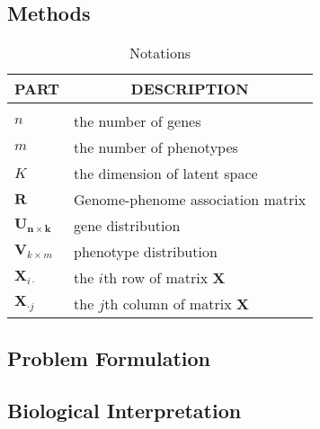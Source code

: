 \documentclass{bioinfo}
\begin{document}
\begin{methods}
\section{Methods}
\begin{table}[t]
\caption{Notations}
\label{sample-table}
\begin{center}
\begin{tabular}{ll}
\multicolumn{1}{c}{\bf PART}  &\multicolumn{1}{c}{\bf DESCRIPTION}
\\ \hline \\
$n$          &the number of genes \\
$m$          &the number of phenotypes \\
$K$          &the dimension of latent space \\
$\bm{R}$          &Genome-phenome association matrix \\
$\bm{U_{n\times k}}$         &gene distribution\\
$\bm{V}_{k\times m}$         &phenotype distribution \\
$\bm{X}_{i\cdot}$  &the $i$th row of matrix $\bm{X}$ \\
$\bm{X}_{\cdot j}$                    &the $j$th column of matrix $\bm{X}$ \\
\end{tabular}
\end{center}
\end{table}
\subsection{Problem Formulation}

\subsection{Biological Interpretation}


\end{methods}
\end{document}
